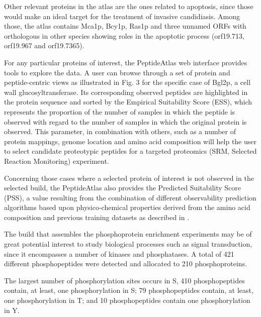 Other relevant proteins in the atlas are the ones related to
apoptosis, since those would make an ideal target for the
treatment of invasive candidiasis. Among those, the atlas
contains Mca1p, Bcy1p, Ras1p and three unnamed ORFs with
orthologous in other species showing roles in the apoptotic
process (orf19.713, orf19.967 and orf19.7365).

For any particular proteins of interest, the PeptideAtlas
web interface provides tools to explore the data. A user can
browse through a set of protein and peptide-centric views as
illustrated in Fig. 3 for the specific case of Bgl2p, a cell wall
glucosyltransferase. Its corresponding observed peptides are
highlighted in the protein sequence and sorted by the
Empirical Suitability Score (ESS), which represents the proportion
 of the number of samples in which the peptide is
observed with regard to the number of samples in which the
original protein is observed. This parameter, in combination
with others, such as a number of protein mappings, genome
location and amino acid composition will help the user to
select candidate proteotypic peptides for a targeted proteomics
 (SRM, Selected Reaction Monitoring) experiment.


Concerning those cases where a selected protein of
interest is not observed in the selected build, the PeptideAtlas
also provides the Predicted Suitability Score (PSS), a value
resulting from the combination of different observability
prediction algorithms based upon physico-chemical properties
 derived from the amino acid composition and previous
training datasets as described in \citep{Mallick2007}.

The build that assembles the phosphoprotein enrichment
experiments may be of great potential interest to study biological
processes such as signal transduction, since it encompasses a
number of kinases and phosphatases. A total of 421 different
phosphopeptides were detected and allocated to 210 phosphoproteins.

The largest number of phosphorylation sites occurs in S,
410 phosphopeptides contain, at least, one phosphorylation in S;
79 phosphopeptides contain, at least, one phosphorylation in T;
and 10 phosphopeptides contain one phosphorylation in Y.

